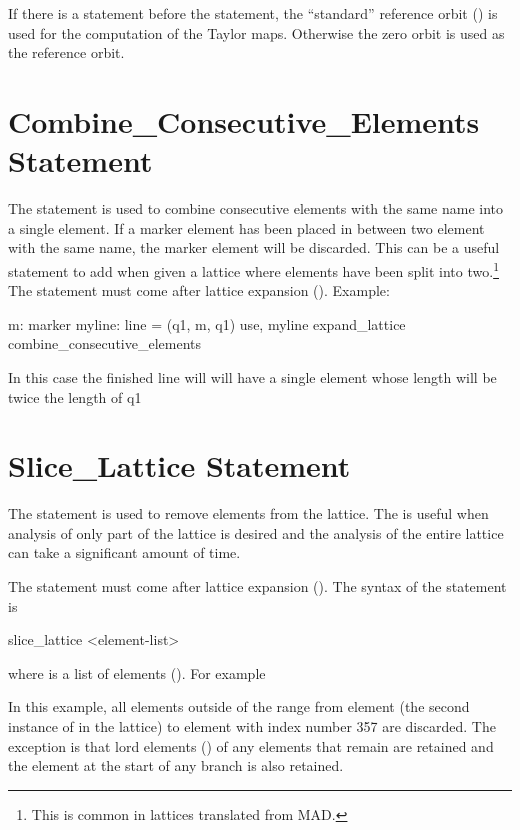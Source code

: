 {{{{{If there is a  statement before the  statement, the
``standard'' reference orbit () is used for the computation of the Taylor
maps. Otherwise the zero orbit is used as the reference orbit.

\section{Combine_Consecutive_Elements Statement}
\label{s:merge.ele}

The  statement is used to combine consecutive elements with the same name into a
single element. If a marker element has been placed in between two element with the same name, the
marker element will be discarded. This can be a useful statement to add when given a lattice where
elements have been split into two.\footnote
  {
This is common in lattices translated from MAD.
  }
The  statement must come after lattice expansion (). Example:
\begin{example}
  m: marker
  myline: line = (q1, m, q1)
  use, myline
  expand_lattice
  combine_consecutive_elements
\end{example}
In this case the finished line will will have a single  element whose length will be twice the length of q1

\section{Slice_Lattice Statement}
\label{s:slice}

The  statement is used to remove elements from the lattice. The 
is useful when analysis of only part of the lattice is desired and the analysis of the entire
lattice can take a significant amount of time.

The  statement must come after lattice expansion (). The syntax of
the  statement is
\begin{example}
  slice_lattice <element-list>
\end{example}
where  is a list of elements (). For example
In this example, all elements outside of the range from element  (the second instance of
 in the lattice) to element with index number 357 are discarded. The exception is that lord
elements () of any elements that remain are retained and the 
element at the start of any branch is also retained.

}}}}}
